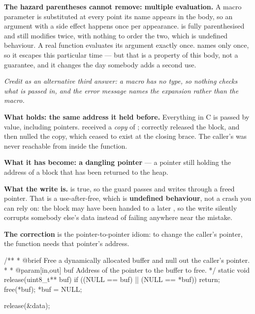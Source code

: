 \textbf{The hazard parentheses cannot remove: multiple evaluation.} A macro parameter is
substituted at every point its name appears in the body, so an argument with a side effect happens
once per appearance.  is fully parenthesised and 
still modifies  twice, with nothing to order the two, which is undefined behaviour. A real
function evaluates its argument exactly once.  names  only once, so
it escapes this particular time --- but that is a property of this body, not a guarantee, and it
changes the day somebody adds a second use. 

\textit{Credit as an alternative third answer: a macro has no type, so nothing checks what is passed
in, and the error message names the expansion rather than the macro.}

\textbf{What  holds: the same address it held before.} Everything in C is passed by
value, including pointers.  received a \emph{copy} of ;
 correctly released the block, and  then nulled the copy, which
ceased to exist at the closing brace. The caller's  was never reachable from inside the
function. 

\textbf{What it has become: a dangling pointer} --- a pointer still holding the address of a block
that has been returned to the heap. 

\textbf{What the write is.}  is true, so the guard passes and
 writes through a freed pointer. That is a use-after-free, which is
\textbf{undefined behaviour}, not a crash you can rely on: the block may have been handed to a
later , so the write silently corrupts somebody else's data instead of failing
anywhere near the mistake. 

\textbf{The correction} is the pointer-to-pointer idiom: to change the caller's pointer, the
function needs that pointer's address.

\begin{ccode}
/**
 * @brief Free a dynamically allocated buffer and null out the caller's pointer.
 *
 * @param[in,out] buf Address of the pointer to the buffer to free.
 */
static void release(uint8_t** buf)
{
    if ((NULL == buf) || (NULL == *buf)) { return; }
    free(*buf);
    *buf = NULL;
}
\end{ccode}

\begin{ccode}
release(&data);
\end{ccode}

